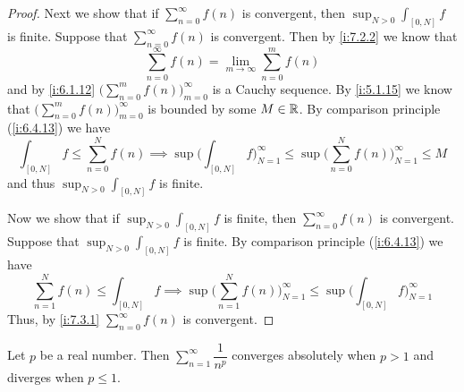 \begin{proof}
  Next we show that if \(\sum_{n = 0}^\infty f(n)\) is convergent, then \(\sup_{N > 0} \int_{[0, N]} f\) is finite.
  Suppose that \(\sum_{n = 0}^\infty f(n)\) is convergent.
  Then by \cref{i:7.2.2} we know that
  \[
    \sum_{n = 0}^\infty f(n) = \lim_{m \to \infty} \sum_{n = 0}^m f(n)
  \]
  and by \cref{i:6.1.12} \(\big(\sum_{n = 0}^m f(n)\big)_{m = 0}^\infty\) is a Cauchy sequence.
  By \cref{i:5.1.15} we know that \(\big(\sum_{n = 0}^m f(n)\big)_{m = 0}^\infty\) is bounded by some \(M \in \mathbb{R}\).
  By comparison principle (\cref{i:6.4.13}) we have
  \[
    \int_{[0, N]} f \leq \sum_{n = 0}^N f(n) \implies \sup\bigg(\int_{[0, N]} f\bigg)_{N = 1}^\infty \leq \sup\bigg(\sum_{n = 0}^N f(n)\bigg)_{N = 1}^\infty \leq M
  \]
  and thus \(\sup_{N > 0} \int_{[0, N]} f\) is finite.

  Now we show that if \(\sup_{N > 0} \int_{[0, N]} f\) is finite, then \(\sum_{n = 0}^\infty f(n)\) is convergent.
  Suppose that \(\sup_{N > 0} \int_{[0, N]} f\) is finite.
  By comparison principle (\cref{i:6.4.13}) we have
  \[
    \sum_{n = 1}^N f(n) \leq \int_{[0, N]} f \implies \sup\bigg(\sum_{n = 1}^N f(n)\bigg)_{N = 1}^\infty \leq \sup\bigg(\int_{[0, N]} f\bigg)_{N = 1}^\infty
  \]
  Thus, by \cref{i:7.3.1} \(\sum_{n = 0}^\infty f(n)\) is convergent.
\end{proof}

\begin{cor}\label{i:11.6.5}
  Let \(p\) be a real number.
  Then \(\sum_{n = 1}^\infty \dfrac{1}{n^p}\) converges absolutely when \(p > 1\) and diverges when \(p \leq 1\).
\end{cor}

